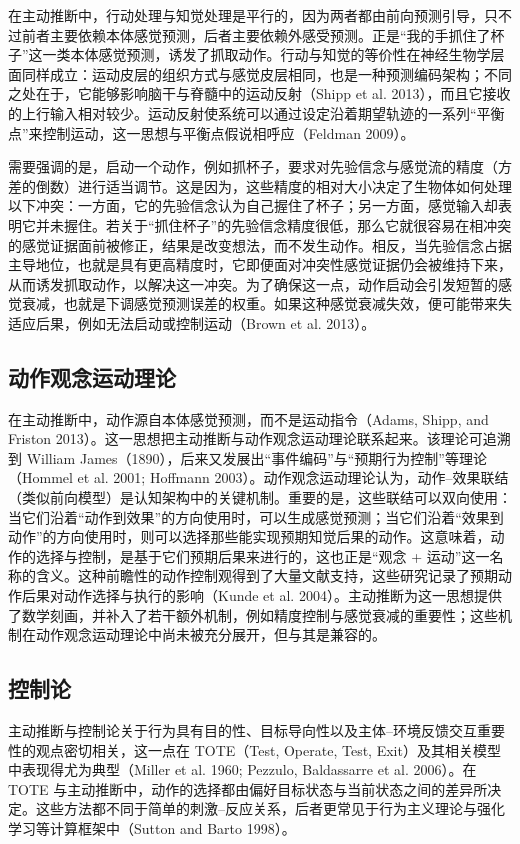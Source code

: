 在主动推断中，行动处理与知觉处理是平行的，因为两者都由前向预测引导，只不过前者主要依赖本体感觉预测，后者主要依赖外感受预测。正是“我的手抓住了杯子”这一类本体感觉预测，诱发了抓取动作。行动与知觉的等价性在神经生物学层面同样成立：运动皮层的组织方式与感觉皮层相同，也是一种预测编码架构；不同之处在于，它能够影响脑干与脊髓中的运动反射（Shipp et al. 2013），而且它接收的上行输入相对较少。运动反射使系统可以通过设定沿着期望轨迹的一系列“平衡点”来控制运动，这一思想与平衡点假说相呼应（Feldman 2009）。

需要强调的是，启动一个动作，例如抓杯子，要求对先验信念与感觉流的精度（方差的倒数）进行适当调节。这是因为，这些精度的相对大小决定了生物体如何处理以下冲突：一方面，它的先验信念认为自己握住了杯子；另一方面，感觉输入却表明它并未握住。若关于“抓住杯子”的先验信念精度很低，那么它就很容易在相冲突的感觉证据面前被修正，结果是改变想法，而不发生动作。相反，当先验信念占据主导地位，也就是具有更高精度时，它即便面对冲突性感觉证据仍会被维持下来，从而诱发抓取动作，以解决这一冲突。为了确保这一点，动作启动会引发短暂的感觉衰减，也就是下调感觉预测误差的权重。如果这种感觉衰减失效，便可能带来失适应后果，例如无法启动或控制运动（Brown et al. 2013）。

\subsection{动作观念运动理论}

在主动推断中，动作源自本体感觉预测，而不是运动指令（Adams, Shipp, and Friston 2013）。这一思想把主动推断与动作观念运动理论联系起来。该理论可追溯到 William James（1890），后来又发展出“事件编码”与“预期行为控制”等理论（Hommel et al. 2001; Hoffmann 2003）。动作观念运动理论认为，动作--效果联结（类似前向模型）是认知架构中的关键机制。重要的是，这些联结可以双向使用：当它们沿着“动作到效果”的方向使用时，可以生成感觉预测；当它们沿着“效果到动作”的方向使用时，则可以选择那些能实现预期知觉后果的动作。这意味着，动作的选择与控制，是基于它们预期后果来进行的，这也正是“观念 + 运动”这一名称的含义。这种前瞻性的动作控制观得到了大量文献支持，这些研究记录了预期动作后果对动作选择与执行的影响（Kunde et al. 2004）。主动推断为这一思想提供了数学刻画，并补入了若干额外机制，例如精度控制与感觉衰减的重要性；这些机制在动作观念运动理论中尚未被充分展开，但与其是兼容的。

\subsection{控制论}

主动推断与控制论关于行为具有目的性、目标导向性以及主体--环境反馈交互重要性的观点密切相关，这一点在 TOTE（Test, Operate, Test, Exit）及其相关模型中表现得尤为典型（Miller et al. 1960; Pezzulo, Baldassarre et al. 2006）。在 TOTE 与主动推断中，动作的选择都由偏好目标状态与当前状态之间的差异所决定。这些方法都不同于简单的刺激--反应关系，后者更常见于行为主义理论与强化学习等计算框架中（Sutton and Barto 1998）。

